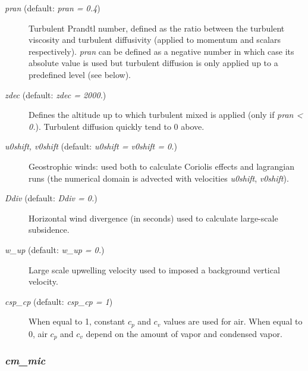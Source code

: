 \documentclass[12pt,A4,french]{article}
\begin{document}
\begin{description}
\item[{\it pran} (default: {\it pran = 0.4})]

Turbulent Prandtl number, defined as the ratio between the turbulent viscosity and turbulent diffusivity (applied to momentum and scalars respectively). {\it pran} can be defined as a negative number in which case its absolute value is used but turbulent diffusion is only applied up to a predefined level (see below). 

\item[{\it zdec} (default: {\it zdec = 2000.})]

Defines the altitude up to which turbulent mixed is applied (only if {\it pran < 0.}). Turbulent diffusion quickly tend to 0 above. 

\item[{\it u0shift, v0shift} (default: {\it u0shift = v0shift = 0.})]

Geostrophic winds: used both to calculate Coriolis effects and lagrangian runs (the numerical domain is advected with velocities {\it u0shift}, {\it v0shift}).

\item[{\it Ddiv} (default: {\it Ddiv = 0.})]

Horizontal wind divergence (in seconds) used to calculate large-scale subsidence.

\item[{\it w\_up} (default: {\it w\_up = 0.})]

Large scale upwelling velocity used to imposed a background vertical velocity.

\item[{\it csp\_cp} (default: {\it csp\_cp = 1})]

When equal to 1, constant $c_p$ and $c_v$ values are used for air. When equal to 0, air $c_p$ and $c_v$ depend on the amount of vapor and condensed vapor.

\end{description}

\subsubsection{{\it cm\_mic}}
\end{document}
